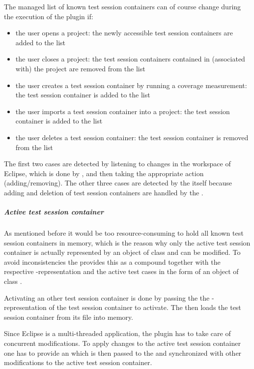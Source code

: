 The managed list of known test session containers can of course change during the execution of the plugin if:
\begin{itemize}
\item the user opens a project: the newly accessible test session containers are added to the list
\item the user closes a project: the test session containers contained in (associated with) the project are removed from the list
\item the user creates a test session container by running a coverage measurement: the test session container is added to the list
\item the user imports a test session container into a project: the test session container is added to the list
\item the user deletes a test session container: the test session container is removed from the list
\end{itemize}
The first two cases are detected by listening to changes in the workspace of Eclipse, which is done by , and then taking the appropriate action (adding/removing). The other three cases are detected by the  itself because adding and deletion of test session containers are handled by the .

\subparagraph{Active test session container}

As mentioned before it would be too resource-consuming to hold all known test session containers in memory, which is the reason why only the active test session container is actually represented by an object of class  and can be modified. To avoid inconsistencies the  provides this  as a compound together with the respective -representation and the active test cases in the form of an object of class .

Activating an other test session container is done by passing the  the -representation of the test session container to activate. The  then loads the test session container from its file into memory.

Since Eclipse is a multi-threaded application, the plugin has to take care of concurrent modifications. To apply changes to the active test session container one has to provide an  which is then passed to the  and synchronized with other modifications to the active test session container.

